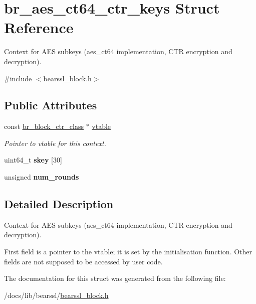 \hypertarget{structbr__aes__ct64__ctr__keys}{}\section{br\+\_\+aes\+\_\+ct64\+\_\+ctr\+\_\+keys Struct Reference}
\label{structbr__aes__ct64__ctr__keys}


Context for A\+ES subkeys ({\ttfamily aes\+\_\+ct64} implementation, C\+TR encryption and decryption).  




{\ttfamily \#include $<$bearssl\+\_\+block.\+h$>$}

\subsection*{Public Attributes}
\begin{DoxyCompactItemize}
\item 
\mbox{\label{structbr__aes__ct64__ctr__keys_a359466407eb584c792c4c284b7b167e2}} 
const \hyperlink{bearssl__block_8h_a8934ac58af503220bfb6e6cbc2cfb209}{br\+\_\+block\+\_\+ctr\+\_\+class} $\ast$ \hyperlink{structbr__aes__ct64__ctr__keys_a359466407eb584c792c4c284b7b167e2}{vtable}
\begin{DoxyCompactList}\small\item\em Pointer to vtable for this context. \end{DoxyCompactList}\item 
\mbox{\label{structbr__aes__ct64__ctr__keys_a9dcdefa84dec675b4488eb2d2afa3106}} 
uint64\+\_\+t {\bfseries skey} \mbox{[}30\mbox{]}
\item 
\mbox{\label{structbr__aes__ct64__ctr__keys_aee8021f42398d1bc448206bdd235e46f}} 
unsigned {\bfseries num\+\_\+rounds}
\end{DoxyCompactItemize}


\subsection{Detailed Description}
Context for A\+ES subkeys ({\ttfamily aes\+\_\+ct64} implementation, C\+TR encryption and decryption). 

First field is a pointer to the vtable; it is set by the initialisation function. Other fields are not supposed to be accessed by user code. 

The documentation for this struct was generated from the following file\+:\begin{DoxyCompactItemize}
\item 
/docs/lib/bearssl/\hyperlink{bearssl__block_8h}{bearssl\+\_\+block.\+h}\end{DoxyCompactItemize}
